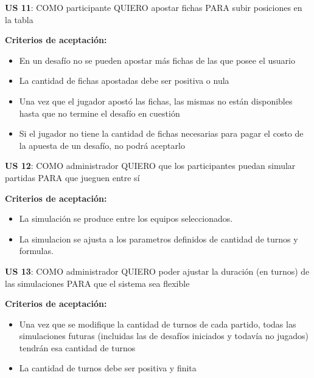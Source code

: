 \begin{tcolorbox}
\textbf{US 11}: COMO participante QUIERO apostar fichas PARA subir posiciones en la tabla

\vline

\textbf{Criterios de aceptación:}
\begin{itemize}
\item En un desafío no se pueden apostar más fichas de las que posee el usuario
\item La cantidad de fichas apostadas debe ser positiva o nula
\item Una vez que el jugador apostó las fichas, las mismas no están disponibles hasta que no termine el desafío en cuestión
\item Si el jugador no tiene la cantidad de fichas necesarias para pagar el costo de la apuesta de un desafío, no podrá aceptarlo
\end{itemize}
\end{tcolorbox}
\vspace{10pt}


\begin{tcolorbox}
\textbf{US 12}: COMO administrador QUIERO que los participantes puedan simular partidas PARA que jueguen entre sí

\vline

\textbf{Criterios de aceptación:}
\begin{itemize}
\item La simulación se produce entre los equipos seleccionados.
\item La simulacion se ajusta a los parametros definidos de cantidad de turnos y formulas.
\end{itemize}
\end{tcolorbox}
\vspace{10pt}


\begin{tcolorbox}
\textbf{US 13}: COMO administrador QUIERO poder ajustar la duración (en turnos) de las simulaciones PARA que el sistema sea flexible

\vline

\textbf{Criterios de aceptación:}
\begin{itemize}
\item Una vez que se modifique la cantidad de turnos de cada partido, todas las simulaciones futuras (incluidas las de desafíos iniciados y todavía no jugados) tendrán esa cantidad de turnos
\item La cantidad de turnos debe ser positiva y finita
\end{itemize}
\end{tcolorbox}
\vspace{10pt}


